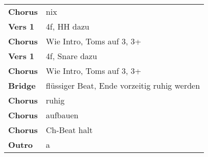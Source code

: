 
\begin{tabular}{p{1.6cm}l}
	\textbf{Chorus} & nix                                         \\
	\textbf{Vers 1} & 4f, HH dazu                                 \\
	\textbf{Chorus} & Wie Intro, Toms auf 3, 3+                   \\
	\textbf{Vers 1} & 4f, Snare dazu                              \\
	\textbf{Chorus} & Wie Intro, Toms auf 3, 3+                   \\
	\textbf{Bridge} & flüssiger Beat, Ende vorzeitig ruhig werden \\
	\textbf{Chorus} & ruhig                                       \\
	\textbf{Chorus} & aufbauen                                    \\
	\textbf{Chorus} & Ch-Beat halt                                \\
	\textbf{Outro}  & a                                           \\
\end{tabular}
